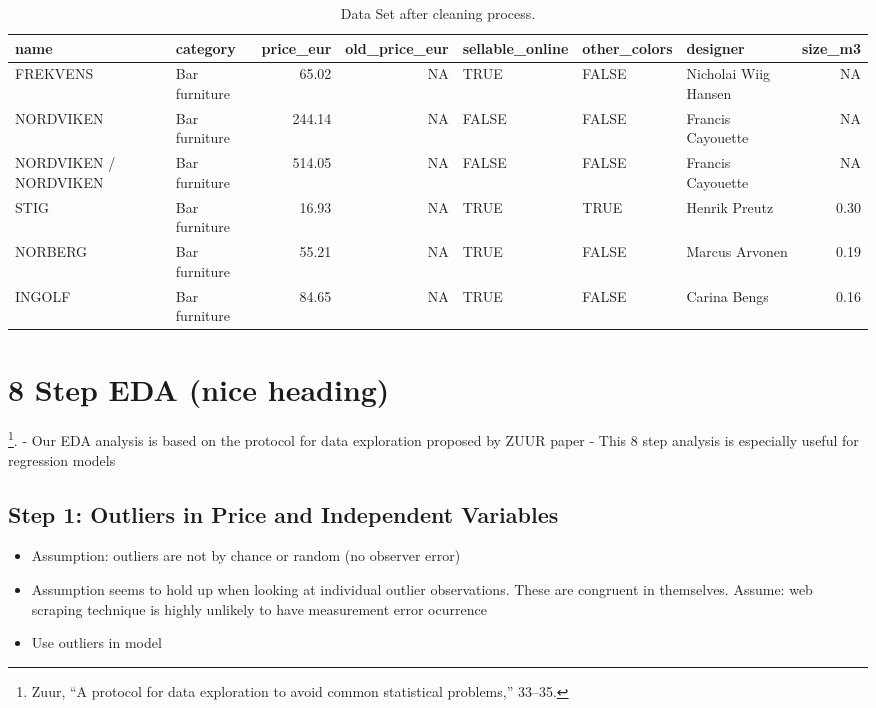 \documentclass[a4paper, nobind]{templates/ociamthesis}
\providecommand{\tightlist}{%
  \setlength{\itemsep}{0pt}\setlength{\parskip}{0pt}}
\begin{document}
\begin{table}

\caption{\label{tab:tidy-ikea}Data Set after cleaning process.}
\centering
\begin{tabular}[t]{l|l|r|r|l|l|l|r}
\hline
name & category & price\_eur & old\_price\_eur & sellable\_online & other\_colors & designer & size\_m3\\
\hline
FREKVENS & Bar furniture & 65.02 & NA & TRUE & FALSE & Nicholai Wiig Hansen & NA\\
\hline
NORDVIKEN & Bar furniture & 244.14 & NA & FALSE & FALSE & Francis Cayouette & NA\\
\hline
NORDVIKEN / NORDVIKEN & Bar furniture & 514.05 & NA & FALSE & FALSE & Francis Cayouette & NA\\
\hline
STIG & Bar furniture & 16.93 & NA & TRUE & TRUE & Henrik Preutz & 0.30\\
\hline
NORBERG & Bar furniture & 55.21 & NA & TRUE & FALSE & Marcus Arvonen & 0.19\\
\hline
INGOLF & Bar furniture & 84.65 & NA & TRUE & FALSE & Carina Bengs & 0.16\\
\hline
\end{tabular}
\end{table}

\hypertarget{tbd}{%
\section{8 Step EDA (nice heading)}\label{tbd}}

\footnote{Zuur, ``A protocol for data exploration to avoid common statistical problems,'' 33--35.}.
- Our EDA analysis is based on the protocol for data exploration proposed by ZUUR paper
- This 8 step analysis is especially useful for regression models

\hypertarget{step-1-outliers-in-price-and-independent-variables}{%
\subsection{Step 1: Outliers in Price and Independent Variables}\label{step-1-outliers-in-price-and-independent-variables}}

\begin{itemize}
\tightlist
\item
  Assumption: outliers are not by chance or random (no observer error)
\item
  Assumption seems to hold up when looking at individual outlier observations. These are congruent in themselves. Assume: web scraping technique is highly unlikely to have measurement error ocurrence
\item
  Use outliers in model
\end{itemize}
\end{document}
